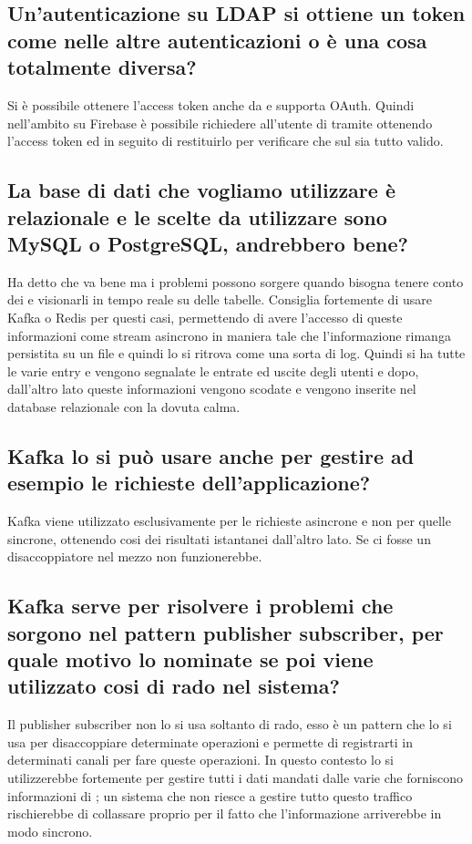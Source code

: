 \subsection{Un'autenticazione su LDAP si ottiene un token come nelle altre autenticazioni o è una cosa totalmente diversa?}
Si è possibile ottenere l'access token anche da  e supporta OAuth. Quindi nell'ambito su Firebase è possibile richiedere all'utente di  tramite  ottenendo 
l'access token ed in seguito di restituirlo per verificare che sul  sia tutto valido.

\subsection{La base di dati che vogliamo utilizzare è relazionale e le scelte da utilizzare sono MySQL o PostgreSQL, andrebbero bene?}
Ha detto che va bene ma i problemi possono sorgere quando bisogna tenere conto dei  e visionarli in tempo reale su delle tabelle. Consiglia fortemente di usare 
Kafka o Redis per questi casi, permettendo di avere l'accesso di queste informazioni come stream asincrono in maniera tale che l'informazione rimanga persistita su un file e 
quindi lo si ritrova come una sorta di log. Quindi si ha tutte le varie entry e vengono segnalate le entrate ed uscite degli utenti e dopo, dall'altro lato queste informazioni 
vengono scodate e vengono inserite nel database relazionale con la dovuta calma. 

\subsection{Kafka lo si può usare anche per gestire ad esempio le richieste dell'applicazione?}
Kafka viene utilizzato esclusivamente per le richieste asincrone e non per quelle sincrone, ottenendo cosi dei risultati istantanei dall'altro lato. 
Se ci fosse un disaccoppiatore nel mezzo non funzionerebbe.

\subsection{Kafka serve per risolvere i problemi che sorgono nel pattern publisher subscriber, per quale motivo lo nominate se poi viene utilizzato cosi di rado nel sistema?}
Il publisher subscriber non lo si usa soltanto di rado, esso è un pattern che lo si usa per disaccoppiare determinate operazioni e permette di registrarti in determinati canali 
per fare queste operazioni. In questo contesto lo si utilizzerebbe fortemente per gestire tutti i dati mandati dalle varie  che forniscono informazioni di ; un sistema 
che non riesce a gestire tutto questo traffico rischierebbe di collassare proprio per il fatto che l'informazione arriverebbe in modo sincrono.

